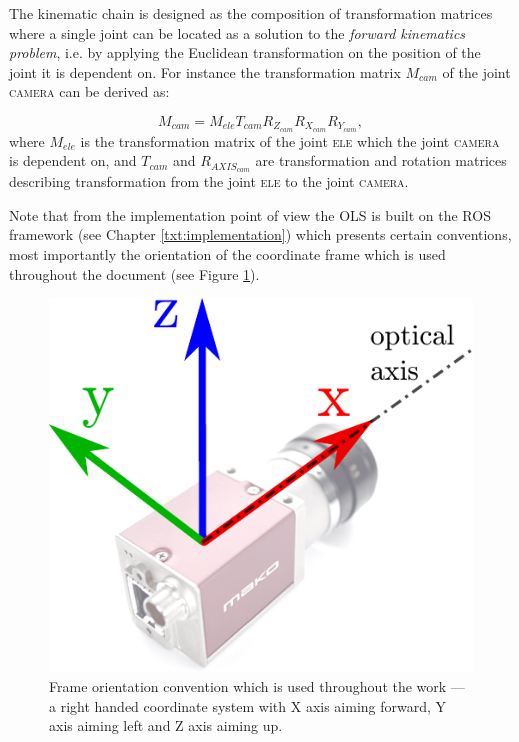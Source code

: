 The kinematic chain is designed as the composition of transformation matrices where a single joint can be located as a solution to the \textit{forward kinematics problem}, i.e. by applying the Euclidean transformation on the position of the joint it is dependent on. For instance the transformation matrix $M_{cam}$ of the joint \textsc{camera} can be derived as:

\begin{equation}
M_{cam} = M_{ele}T_{cam}R_{Z_{cam}}R_{X_{cam}}R_{Y_{cam}},
\end{equation}
where $M_{ele}$ is the transformation matrix of the joint \textsc{ele} which the joint \textsc{camera} is dependent on, and $T_{cam}$ and $R_{AXIS_{cam}}$ are transformation and rotation matrices describing transformation from the joint \textsc{ele} to the joint \textsc{camera}. 

Note that from the implementation point of view the OLS is built on the ROS framework (see Chapter \ref{txt:implementation}) which presents certain conventions, most importantly the orientation of the coordinate frame which is used throughout the document (see Figure \ref{fig:frame_convention}).

\begin{figure}[htb]
	\centering
	\includegraphics[width=0.2\linewidth]{fig/frame_convention.pdf}
	\caption{Frame orientation convention which is used throughout the work --- a right handed coordinate system with X axis aiming forward, Y axis aiming left and Z axis aiming up.}
	\label{fig:frame_convention}
\end{figure}

